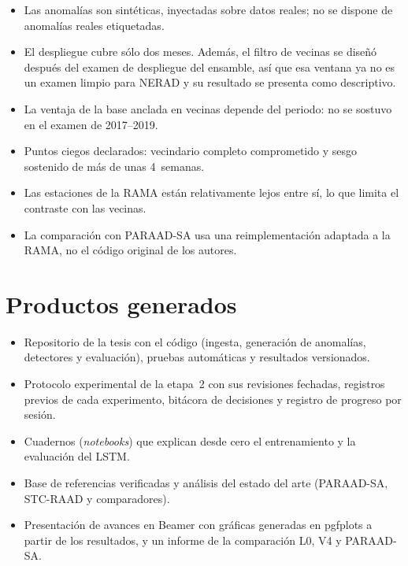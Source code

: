 \documentclass[11pt, letterpaper]{article}
\begin{document}
\begin{itemize}
  \item Las anomalías son sintéticas, inyectadas sobre datos reales; no se dispone de
    anomalías reales etiquetadas.
  \item El despliegue cubre sólo dos meses. Además, el filtro de vecinas se diseñó después
    del examen de despliegue del ensamble, así que esa ventana ya no es un examen limpio
    para NERAD y su resultado se presenta como descriptivo.
  \item La ventaja de la base anclada en vecinas depende del periodo: no se sostuvo en el
    examen de 2017--2019.
  \item Puntos ciegos declarados: vecindario completo comprometido y sesgo sostenido de más
    de unas 4~semanas.
  \item Las estaciones de la RAMA están relativamente lejos entre sí, lo que limita el
    contraste con las vecinas.
  \item La comparación con PARAAD-SA usa una reimplementación adaptada a la RAMA, no el
    código original de los autores.
\end{itemize}

\section{Productos generados}

\begin{itemize}
  \item Repositorio de la tesis con el código (ingesta, generación de anomalías,
    detectores y evaluación), pruebas automáticas y resultados versionados.
  \item Protocolo experimental de la etapa~2 con sus revisiones fechadas, registros
    previos de cada experimento, bitácora de decisiones y registro de progreso por sesión.
  \item Cuadernos (\emph{notebooks}) que explican desde cero el entrenamiento y la
    evaluación del LSTM.
  \item Base de referencias verificadas y análisis del estado del arte (PARAAD-SA,
    STC-RAAD y comparadores).
  \item Presentación de avances en Beamer con gráficas generadas en pgfplots a partir de
    los resultados, y un informe de la comparación L0, V4 y PARAAD-SA.
\end{itemize}

\end{document}
